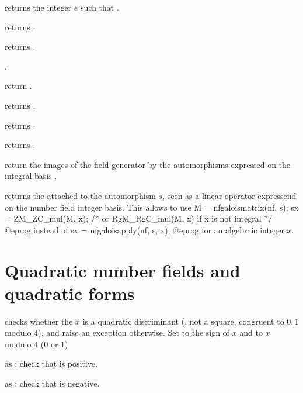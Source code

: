  returns the integer $e$ such that
.

 returns .

 returns .

 .

 return .

 returns .

 returns .

 returns .


return the images of the field generator by the automorphisms
 expressed on the integral basis .

 returns the  attached to
the automorphism $s$, seen as a linear operator expressend on the number
field integer basis. This allows to use
\bprog
  M = nfgaloismatrix(nf, s);
  sx = ZM_ZC_mul(M, x);   /* or RgM_RgC_mul(M, x) if x is not integral */
@eprog\noindent
instead of
\bprog
  sx = nfgaloisapply(nf, s, x);
@eprog\noindent
for an algebraic integer $x$.

\section{Quadratic number fields and quadratic forms}


checks whether the  $x$ is a quadratic discriminant (,
not a square, congruent to $0,1$ modulo $4$), and raise an exception
otherwise. Set  to the sign of $x$ and  to $x$ modulo
$4$ (0 or 1).

 as
; check that  is positive.

 as
; check that  is negative.


